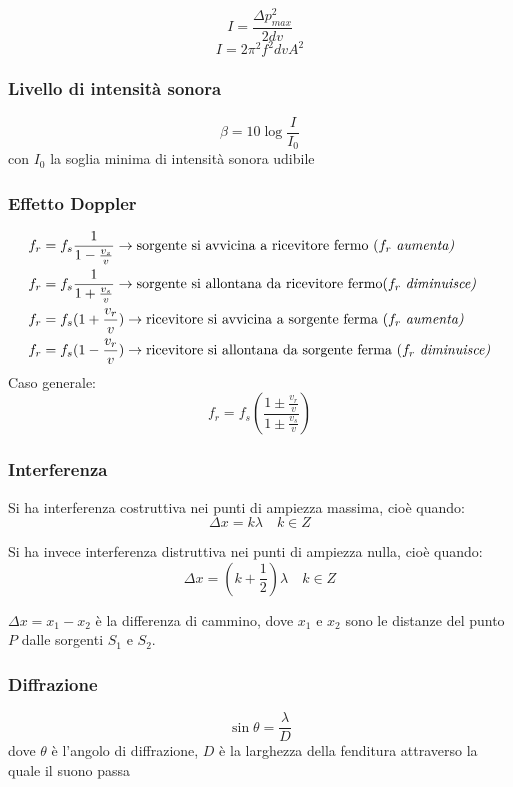 \documentclass{article}
\begin{document}
\vspace{1em}

$$ I = \frac{\Delta p_{max}^2}{2dv} $$
$$ I = 2\pi^2 f^2 dvA^2 $$

\subsubsection*{Livello di intensità sonora}
$$ \beta = 10 \log\frac{I}{I_0} $$
con $I_0$ la soglia minima di intensità sonora udibile

\subsubsection*{Effetto Doppler}
\begin{align*}
    f_r &= f_s \frac{1}{1 - \frac{v_s}{v}} \rightarrow \text{sorgente si avvicina a ricevitore fermo ($f_r$ \textit{aumenta)}} \\
    f_r &= f_s \frac{1}{1 + \frac{v_s}{v}} \rightarrow \text{sorgente si allontana da ricevitore fermo($f_r$ \textit{diminuisce)}} \\
    f_r &= f_s(1 + \frac{v_r}{v}) \rightarrow \text{ricevitore si avvicina a sorgente ferma ($f_r$ \textit{aumenta)}} \\
    f_r &= f_s(1 - \frac{v_r}{v}) \rightarrow \text{ricevitore si allontana da sorgente ferma ($f_r$ \textit{diminuisce)}}
\end{align*}
Caso generale:
$$ f_r = f_s\left(\frac{1 \pm \frac{v_r}{v}}{1 \pm \frac{v_s}{v}}\right) $$

\subsubsection*{Interferenza}
Si ha interferenza costruttiva nei punti di ampiezza massima, cioè quando:
$$ \Delta x = k\lambda \hspace{1em} k \in Z$$

\vspace{1em}

Si ha invece interferenza distruttiva nei punti di ampiezza nulla, cioè quando:
$$ \Delta x = (k+\frac{1}{2})\lambda \hspace{1em} k \in Z $$

$\Delta x = x_1-x_2$ è la differenza di cammino, dove $x_1$ e $x_2$ sono le distanze del punto $P$ dalle sorgenti $S_1$ e $S_2$.

\subsubsection*{Diffrazione}
$$ \sin{\theta} = \frac{\lambda}{D} $$
dove $\theta$ è l'angolo di diffrazione, $D$ è la larghezza della fenditura attraverso la quale il suono passa
\end{document}
